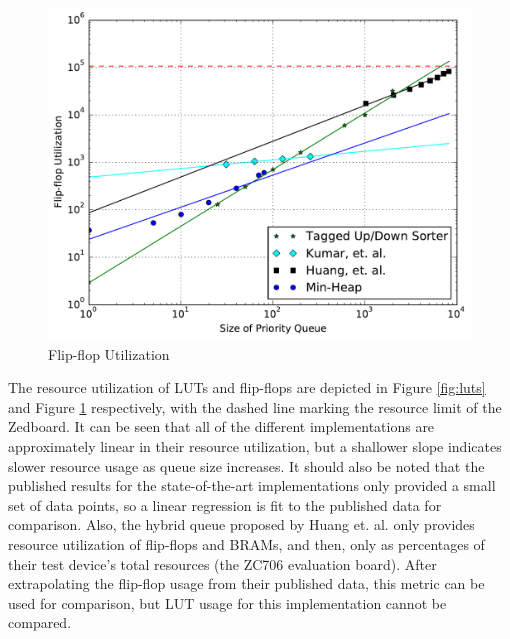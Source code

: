 \begin{figure}[t!]
	\centering
	\includegraphics[width=\columnwidth]{data/ff_utilization.pdf}
	\caption{Flip-flop Utilization}
	\label{fig:ffs}
\end{figure}

The resource utilization of LUTs and flip-flops are depicted in Figure \ref{fig:luts} and Figure \ref{fig:ffs} respectively, with the dashed line marking the resource limit of the Zedboard. It can be seen that all of the different implementations are approximately linear in their resource utilization, but a shallower slope indicates slower resource usage as queue size increases. It should also be noted that the published results for the state-of-the-art implementations only provided a small set of data points, so a linear regression is fit to the published data for comparison. Also, the hybrid queue proposed by Huang et. al. only provides resource utilization of flip-flops and BRAMs, and then, only as percentages of their test device's total resources (the ZC706 evaluation board). After extrapolating the flip-flop usage from their published data, this metric can be used for comparison, but LUT usage for this implementation cannot be compared.

